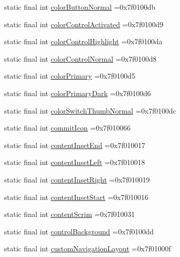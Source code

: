 \begin{DoxyCompactItemize}
\item 
static final int \hyperlink{classcheck_1_1test_1_1_r_1_1attr_abef35f07161bdd7ae466dc158b37e59b}{color\+Button\+Normal} =0x7f0100db
\item 
static final int \hyperlink{classcheck_1_1test_1_1_r_1_1attr_a14f760733777b8233047aeac34c893e6}{color\+Control\+Activated} =0x7f0100d9
\item 
static final int \hyperlink{classcheck_1_1test_1_1_r_1_1attr_a2126d505b83f9a4e9ff11e55eb19ebe8}{color\+Control\+Highlight} =0x7f0100da
\item 
static final int \hyperlink{classcheck_1_1test_1_1_r_1_1attr_aaf758f83271cca56f8236b89bc085b85}{color\+Control\+Normal} =0x7f0100d8
\item 
static final int \hyperlink{classcheck_1_1test_1_1_r_1_1attr_a0b0ddf92c45ba1dc992336304fdcd1f9}{color\+Primary} =0x7f0100d5
\item 
static final int \hyperlink{classcheck_1_1test_1_1_r_1_1attr_a2a07aa51383e02b9f388ec5ac6cd9b99}{color\+Primary\+Dark} =0x7f0100d6
\item 
static final int \hyperlink{classcheck_1_1test_1_1_r_1_1attr_a97c7cb59a0e732bdf75408a5029196c7}{color\+Switch\+Thumb\+Normal} =0x7f0100dc
\item 
static final int \hyperlink{classcheck_1_1test_1_1_r_1_1attr_a862aaa7d2b544ac9dac2c49d10089fa0}{commit\+Icon} =0x7f010066
\item 
static final int \hyperlink{classcheck_1_1test_1_1_r_1_1attr_ae54701e7140ba2c59574741d9e6cde46}{content\+Inset\+End} =0x7f010017
\item 
static final int \hyperlink{classcheck_1_1test_1_1_r_1_1attr_a17f59061d06d3a375e4d728f01e99a9b}{content\+Inset\+Left} =0x7f010018
\item 
static final int \hyperlink{classcheck_1_1test_1_1_r_1_1attr_a72fa272b4d22878eaf90ba1b801a2aa2}{content\+Inset\+Right} =0x7f010019
\item 
static final int \hyperlink{classcheck_1_1test_1_1_r_1_1attr_aff1a02632be3b62d04d2aff4c7f17b43}{content\+Inset\+Start} =0x7f010016
\item 
static final int \hyperlink{classcheck_1_1test_1_1_r_1_1attr_ae9b64be1267d0d817f88a850226d571f}{content\+Scrim} =0x7f010031
\item 
static final int \hyperlink{classcheck_1_1test_1_1_r_1_1attr_a7aec8ace341918ac5a656918317fe5a6}{control\+Background} =0x7f0100dd
\item 
static final int \hyperlink{classcheck_1_1test_1_1_r_1_1attr_a6132e124e79744e029a15cfffe9bc575}{custom\+Navigation\+Layout} =0x7f01000f

\end{DoxyCompactItemize}
